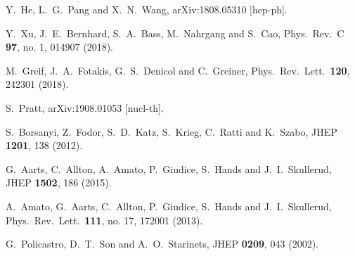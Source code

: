 \documentclass[aps,prc,nofootinbib,showpacs,superscriptaddress,groupedaddress]{revtex4-1}
\begin{document}
\begin{thebibliography}{99}
  Y.~He, L.~G.~Pang and X.~N.~Wang,
  arXiv:1808.05310 [hep-ph].

  Y.~Xu, J.~E.~Bernhard, S.~A.~Bass, M.~Nahrgang and S.~Cao,
  Phys.\ Rev.\ C {\bf 97}, no. 1, 014907 (2018).
  
  M.~Greif, J.~A.~Fotakis, G.~S.~Denicol and C.~Greiner,
  Phys.\ Rev.\ Lett.\  {\bf 120}, 242301 (2018).

  S.~Pratt,
  arXiv:1908.01053 [nucl-th].

  S.~Borsanyi, Z.~Fodor, S.~D.~Katz, S.~Krieg, C.~Ratti and K.~Szabo,
  JHEP {\bf 1201}, 138 (2012).

  G.~Aarts, C.~Allton, A.~Amato, P.~Giudice, S.~Hands and J.~I.~Skullerud,
  JHEP {\bf 1502}, 186 (2015).

  A.~Amato, G.~Aarts, C.~Allton, P.~Giudice, S.~Hands and J.~I.~Skullerud,
  Phys.\ Rev.\ Lett.\  {\bf 111}, no. 17, 172001 (2013).

  G.~Policastro, D.~T.~Son and A.~O.~Starinets,
  JHEP {\bf 0209}, 043 (2002).


\end{thebibliography}
\end{document}
